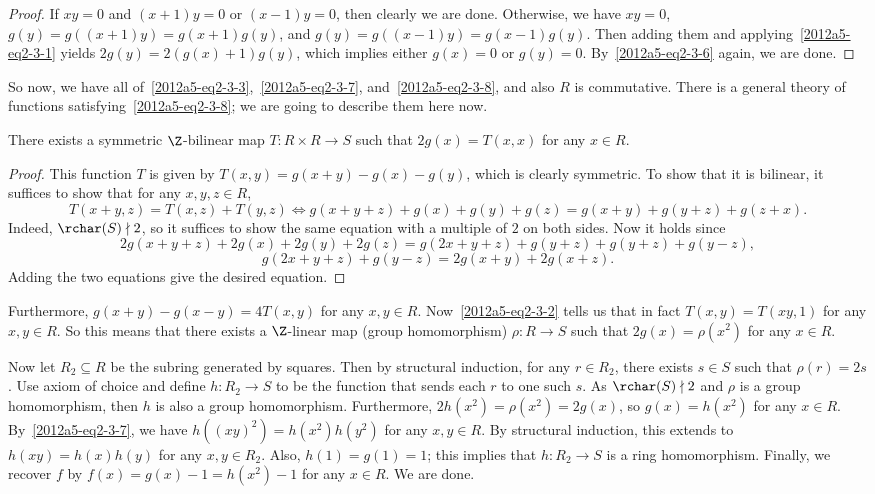 \begin{itemize}
\begin{proof}
    If $xy = 0$ and $(x + 1) y = 0$ or $(x - 1) y = 0$, then clearly we are done.
    Otherwise, we have $xy = 0$, $g(y) = g((x + 1) y) = g(x + 1) g(y)$, and $g(y) = g((x - 1) y) = g(x - 1) g(y)$.
    Then adding them and applying~\eqref{2012a5-eq2-3-1} yields $2 g(y) = 2 (g(x) + 1) g(y)$, which implies either $g(x) = 0$ or $g(y) = 0$.
    By~\eqref{2012a5-eq2-3-6} again, we are done.
    \end{proof}

    So now, we have all of~\eqref{2012a5-eq2-3-3},~\eqref{2012a5-eq2-3-7}, and~\eqref{2012a5-eq2-3-8}, and also $R$ is commutative.
    There is a general theory of functions satisfying~\eqref{2012a5-eq2-3-8}; we are going to describe them here now.
    
    \begin{claim}
    There exists a symmetric $\Z$-bilinear map $T : R \times R \to S$ such that $2 g(x) = T(x, x)$ for any $x \in R$.
    \end{claim}
    \begin{proof}
    This function $T$ is given by $T(x, y) = g(x + y) - g(x) - g(y)$, which is clearly symmetric.
    To show that it is bilinear, it suffices to show that for any $x, y, z \in R$,
    \[ T(x + y, z) = T(x, z) + T(y, z) \iff g(x + y + z) + g(x) + g(y) + g(z) = g(x + y) + g(y + z) + g(z + x). \]
    Indeed, $\rchar(S) \nmid 2$, so it suffices to show the same equation with a multiple of $2$ on both sides.
    Now it holds since
    \[ 2 g(x + y + z) + 2 g(x) + 2 g(y) + 2 g(z) = g(2x + y + z) + g(y + z) + g(y + z) + g(y - z), \]
    \[ g(2x + y + z) + g(y - z) = 2 g(x + y) + 2 g(x + z). \]
    Adding the two equations give the desired equation.
    \end{proof}

    Furthermore, $g(x + y) - g(x - y) = 4 T(x, y)$ for any $x, y \in R$.
    Now~\eqref{2012a5-eq2-3-2} tells us that in fact $T(x, y) = T(xy, 1)$ for any $x, y \in R$.
    So this means that there exists a $\Z$-linear map (group homomorphism) $\rho : R \to S$ such that $2 g(x) = \rho(x^2)$ for any $x \in R$.
    
    Now let $R_2 \subseteq R$ be the subring generated by squares.
    Then by structural induction, for any $r \in R_2$, there exists $s \in S$ such that $\rho(r) = 2s$.
    Use axiom of choice and define $h : R_2 \to S$ to be the function that sends each $r$ to one such $s$.
    As $\rchar(S) \nmid 2$ and $\rho$ is a group homomorphism, then $h$ is also a group homomorphism.
    Furthermore, $2 h(x^2) = \rho(x^2) = 2 g(x)$, so $g(x) = h(x^2)$ for any $x \in R$.
    By~\eqref{2012a5-eq2-3-7}, we have $h((xy)^2) = h(x^2) h(y^2)$ for any $x, y \in R$.
    By structural induction, this extends to $h(xy) = h(x) h(y)$ for any $x, y \in R_2$.
    Also, $h(1) = g(1) = 1$; this implies that $h : R_2 \to S$ is a ring homomorphism.
    Finally, we recover $f$ by $f(x) = g(x) - 1 = h(x^2) - 1$ for any $x \in R$.
    We are done.

\end{itemize}




